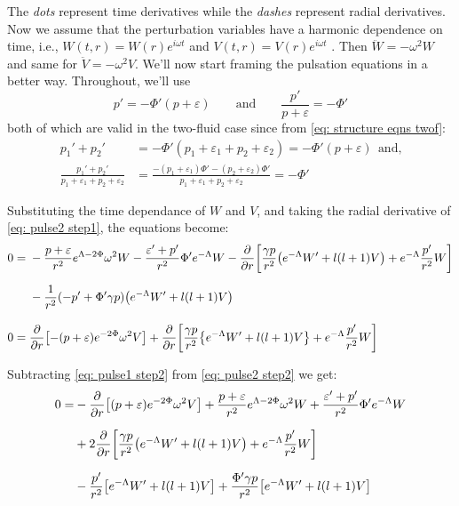 \documentclass[a4paper,12pt,onehalfspacing]{report}
\begin{document}
The \emph{dots} represent time derivatives while the \emph{dashes} represent radial derivatives. Now we assume that the perturbation variables have a harmonic dependence on time, i.e., $W(t,r)= W(r)e^{i\omega t}$ and $V(t,r)= V(r)e^{i\omega t}$ \cite{Thorne_Campo}. Then $\ddot {W}= -\omega^2 W$ and same for $\ddot {V}= -\omega^2 V$. We'll now start framing the pulsation equations in a better way. Throughout, we'll use $$p'= -\Phi'(p+\varepsilon)\qquad\text{and}\qquad\frac{p'}{p+\varepsilon}= -\Phi'$$ both of which are valid in the two-fluid case since from \cref{eq: structure eqns twof}: 
\begin{align*}
    p_1'+p_2'&= -\Phi'(p_1+\varepsilon_1+p_2+\varepsilon_2)= -\Phi'(p+\varepsilon)\ \ \text{and,}\\[1.5ex]
    \frac{p_1'+p_2'}{p_1+\varepsilon_1+p_2+\varepsilon_2}&=\frac{-(p_1+\varepsilon_1)\Phi'-(p_2+\varepsilon_2)\Phi'}{p_1+\varepsilon_1+p_2+\varepsilon_2}= -\Phi'
\end{align*}

Substituting the time dependance of $W$ and $V$, and taking the radial derivative of \cref{eq: pulse2 step1}, the equations become:
\begin{align}
    0={} & -\frac{p+\varepsilon}{r^2}e^{\Lambda-2\Phi}\omega^2{W}- \frac{\varepsilon'+p'}{r^2}\Phi' e^{-\Lambda}{W}\nonumber-\pdv{}{r}\qty[\frac{\gamma p}{r^2}\qty({e^{-\Lambda}W'+l(l+1)V})+e^{-\Lambda}\frac{p'}{r^2}W]\nonumber\\[1.5ex]
    &-\frac{1}{r^2}\qty(-p'+ \Phi'\gamma p)\qty(e^{-\Lambda}W'+l(l+1)V)\label{eq: pulse1 step2}\\[2ex]
   0={} & \pdv{}{r}\qty[-\qty(p+\varepsilon)e^{-2\Phi}\omega^2{V}]+\pdv{}{r}\qty[\frac{\gamma p}{r^2}\qty{e^{-\Lambda}W'+l(l+1)V}+e^{-\Lambda}\frac{p'}{r^2}W]\label{eq: pulse2 step2}
\end{align}

Subtracting \cref{eq: pulse1 step2} from \cref{eq: pulse2 step2} we get:
\begin{align}
    0=& -\pdv{}{r}\qty[\qty(p+\varepsilon)e^{-2\Phi}\omega^2{V}]+\frac{p+\varepsilon}{r^2}e^{\Lambda-2\Phi}\omega^2{W}+ \frac{\varepsilon'+p'}{r^2}\Phi' e^{-\Lambda}{W}\nonumber\\[1.5ex]
    &+2\pdv{}{r}\qty[\frac{\gamma p}{r^2}\qty(e^{-\Lambda}W'+l(l+1)V)+e^{-\Lambda}\frac{p'}{r^2}W]\nonumber\\[1.5ex]
    &-\frac{p'}{r^2}\qty[e^{-\Lambda}W'+l(l+1)V]+ \frac{\Phi'\gamma p}{ r^2}\qty[e^{-\Lambda}W'+l(l+1)V]
\end{align}
\end{document}
